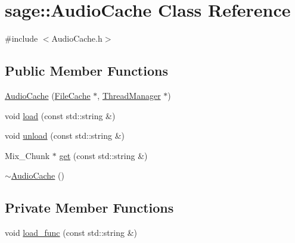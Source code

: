 \hypertarget{classsage_1_1AudioCache}{}\section{sage\+::Audio\+Cache Class Reference}
\label{classsage_1_1AudioCache}


{\ttfamily \#include $<$Audio\+Cache.\+h$>$}

\subsection*{Public Member Functions}
\begin{DoxyCompactItemize}
\item 
\mbox{\hyperlink{classsage_1_1AudioCache_a6fc6a4437b98c4ef0aa5d30f05c4c571}{Audio\+Cache}} (\mbox{\hyperlink{classsage_1_1FileCache}{File\+Cache}} $\ast$, \mbox{\hyperlink{classsage_1_1ThreadManager}{Thread\+Manager}} $\ast$)
\item 
void \mbox{\hyperlink{classsage_1_1AudioCache_aafae5e1d8e31d8beac67b1326f59712a}{load}} (const std\+::string \&)
\item 
void \mbox{\hyperlink{classsage_1_1AudioCache_a91a1bae14653a9f8b085adffdb2dbacf}{unload}} (const std\+::string \&)
\item 
Mix\+\_\+\+Chunk $\ast$ \mbox{\hyperlink{classsage_1_1AudioCache_a2a9ba507b403201dfb9d5d7b85160cb4}{get}} (const std\+::string \&)
\item 
\mbox{\hyperlink{classsage_1_1AudioCache_a83e03cef642e3988abff4846c2b962d3}{$\sim$\+Audio\+Cache}} ()
\end{DoxyCompactItemize}
\subsection*{Private Member Functions}
\begin{DoxyCompactItemize}
\item 
void \mbox{\hyperlink{classsage_1_1AudioCache_a06400f89de15e5db96b8f0cbd27c71e3}{load\+\_\+func}} (const std\+::string \&)
\end{DoxyCompactItemize}
